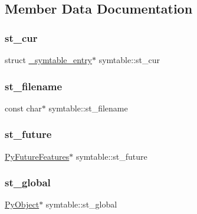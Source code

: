 \subsection{Member Data Documentation}
\mbox{\label{structsymtable_ae79ef4b7d6cd0f034c75561fb4ae5aa0}} 
\subsubsection{\texorpdfstring{st\_cur}{st\_cur}}
{\footnotesize\ttfamily struct \mbox{\hyperlink{struct__symtable__entry}{\+\_\+symtable\+\_\+entry}}$\ast$ symtable\+::st\+\_\+cur}

\mbox{\label{structsymtable_a18850c493ec0be18828d8a2ca620a742}} 
\subsubsection{\texorpdfstring{st\_filename}{st\_filename}}
{\footnotesize\ttfamily const char$\ast$ symtable\+::st\+\_\+filename}

\mbox{\label{structsymtable_ae8e551973e941466d3d5fee2f96c0815}} 
\subsubsection{\texorpdfstring{st\_future}{st\_future}}
{\footnotesize\ttfamily \mbox{\hyperlink{struct_py_future_features}{Py\+Future\+Features}}$\ast$ symtable\+::st\+\_\+future}

\mbox{\label{structsymtable_a7c81861d1b92f6354eee2de2e83585fd}} 
\subsubsection{\texorpdfstring{st\_global}{st\_global}}
{\footnotesize\ttfamily \mbox{\hyperlink{_python27_2object_8h_aadc84ac7aed2cfa6f20c25f62bf3dac7}{Py\+Object}}$\ast$ symtable\+::st\+\_\+global}


